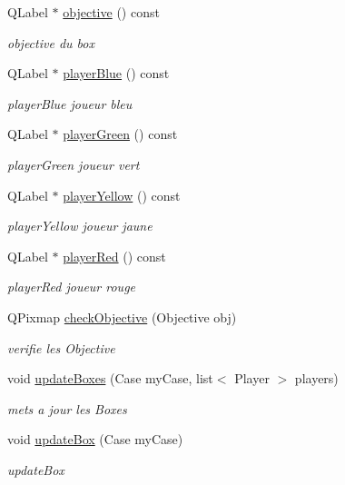 \begin{DoxyCompactItemize}
Q\+Label $\ast$ \mbox{\hyperlink{class_box_addada4538ebe16ffd8bef3bb6bf2c83d}{objective}} () const
\begin{DoxyCompactList}\small\item\em objective du box \end{DoxyCompactList}\item 
Q\+Label $\ast$ \mbox{\hyperlink{class_box_abd111ee14102d32764733f0459d691a7}{player\+Blue}} () const
\begin{DoxyCompactList}\small\item\em player\+Blue joueur bleu \end{DoxyCompactList}\item 
Q\+Label $\ast$ \mbox{\hyperlink{class_box_a641488c3839a9825f06aaf4b82ccba32}{player\+Green}} () const
\begin{DoxyCompactList}\small\item\em player\+Green joueur vert \end{DoxyCompactList}\item 
Q\+Label $\ast$ \mbox{\hyperlink{class_box_a4e5e1a2e7f098dddf12db8354c717ecd}{player\+Yellow}} () const
\begin{DoxyCompactList}\small\item\em player\+Yellow joueur jaune \end{DoxyCompactList}\item 
Q\+Label $\ast$ \mbox{\hyperlink{class_box_a2c7957bb93e1d75369c185b23a9b5b1c}{player\+Red}} () const
\begin{DoxyCompactList}\small\item\em player\+Red joueur rouge \end{DoxyCompactList}\item 
Q\+Pixmap \mbox{\hyperlink{class_box_a3db8ad83e6f0562417ce3d9d9b682316}{check\+Objective}} (Objective obj)
\begin{DoxyCompactList}\small\item\em verifie les Objective \end{DoxyCompactList}\item 
void \mbox{\hyperlink{class_box_a5e750fe0b615bb71255701f04975c3e8}{update\+Boxes}} (Case my\+Case, list$<$ Player $>$ players)
\begin{DoxyCompactList}\small\item\em mets a jour les Boxes \end{DoxyCompactList}\item 
void \mbox{\hyperlink{class_box_aec16e613cc17e290448fa203c8968052}{update\+Box}} (Case my\+Case)
\begin{DoxyCompactList}\small\item\em update\+Box \end{DoxyCompactList}\end{DoxyCompactItemize}

